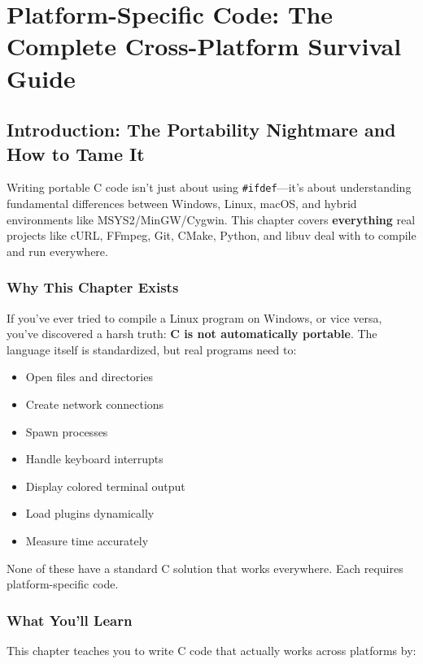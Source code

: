 \chapter{Platform-Specific Code: The Complete Cross-Platform Survival Guide}

\section{Introduction: The Portability Nightmare and How to Tame It}

Writing portable C code isn't just about using \texttt{\#ifdef}---it's about understanding fundamental differences between Windows, Linux, macOS, and hybrid environments like MSYS2/MinGW/Cygwin. This chapter covers \textbf{everything} real projects like cURL, FFmpeg, Git, CMake, Python, and libuv deal with to compile and run everywhere.

\subsection{Why This Chapter Exists}

If you've ever tried to compile a Linux program on Windows, or vice versa, you've discovered a harsh truth: \textbf{C is not automatically portable}. The language itself is standardized, but real programs need to:

\begin{itemize}
    \item Open files and directories
    \item Create network connections
    \item Spawn processes
    \item Handle keyboard interrupts
    \item Display colored terminal output
    \item Load plugins dynamically
    \item Measure time accurately
\end{itemize}

None of these have a standard C solution that works everywhere. Each requires platform-specific code.

\subsection{What You'll Learn}

This chapter teaches you to write C code that actually works across platforms by:

